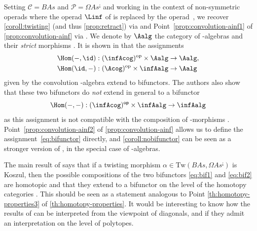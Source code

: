 \documentclass[JEP,XML,SOM,NoFloatCountersInSection,Unicode,published]{cedram}
\theoremstyle{definition}
\theoremstyle{plain}
\begin{document}
Setting $\mathcal{C}=B As$ and $\mathcal{P}=\Omega As^{\text{¡}}$ and working in the context of non-symmetric operads where the operad $\Linf$ of \cite{RobertNicoudWierstraI,RobertNicoudWierstraII} is replaced by the operad~\Ainf, we recover \cref{coroll:twisting} (and thus \cref{prop:retract}) via \cite[Th.\,7.1]{RobertNicoudWierstraI} and Point~\eqref{prop:convolution-ainf1} of \cref{prop:convolution-ainf} via \cite[Th.\,4.1]{RobertNicoudWierstraI}.
We denote by $\Aalg$ the category of \Ainf-algebras and their \emph{strict} morphisms \cite[\S 10.2.1]{LodayVallette12}.
It is shown in \cite[Cor.\,5.4]{RobertNicoudWierstraI} that the assignments
\begin{align}
\Hom(-,\id) &: (\infAcog)^{\mathrm{op}} \times \Aalg \to \Aalg, \label{eq:bif1} \\
\Hom(\id, -) &: (\Acog)^{\mathrm{op}} \times \infAalg \to \Aalg \label{eq:bif2}
\end{align}
given by the convolution \Ainf-algebra extend to bifunctors.
The authors also show that these two bifunctors do \emph{not} extend in general to a bifunctor
\begin{equation}
\Hom(-,-) : \mathsf{(\infAcog)^{op}} \times \infAalg \to \infAalg \label{eq:bifunctor}
\end{equation}
as this assignment is not compatible with the composition of \Ainf-morphisms \cite[Th.\,6.6]{RobertNicoudWierstraI}.
Point~\eqref{prop:convolution-ainf2} of \cref{prop:convolution-ainf} allows us to define the assignment~\eqref{eq:bifunctor} directly, and \cref{coroll:nobifunctor} can be seen as a stronger version of \cite[Th.\,6.6]{RobertNicoudWierstraI}, in the special case of \Ainf-algebras.

The main result of \cite{RobertNicoudWierstraII} says that if a twisting morphism $\alpha \in \mathrm{Tw}(B As,\Omega As^{\text{¡}})$ is Koszul, then the possible compositions of the two bifunctors \eqref{eq:bif1} and \eqref{eq:bif2} are homotopic and that they extend to a bifunctor on the level of the homotopy categories \cite[Th.\,3.6 and Cor.\,3.8]{RobertNicoudWierstraII}.
This should be seen as a statement analogous to Point \eqref{th:homotopy-properties3} of \cref{th:homotopy-properties}. It would be interesting to know how the results of \cite{RobertNicoudWierstraI,RobertNicoudWierstraII} can be interpreted from the viewpoint of diagonals, and if they admit an interpretation on the level of polytopes.

 \label{ss:diag-symp}
\end{document}
